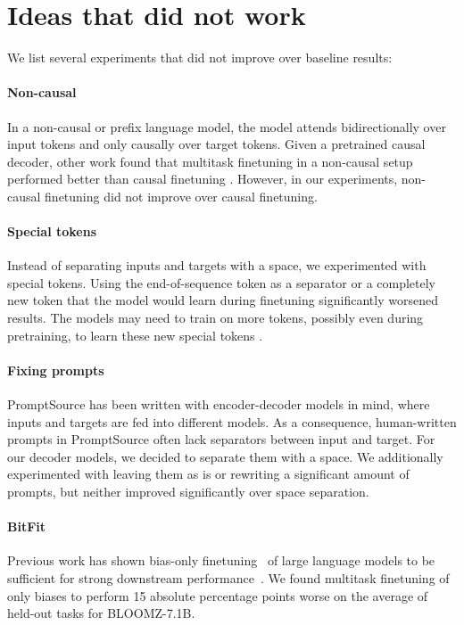 \documentclass[11pt]{article}
\begin{document}
 
\FloatBarrier

\section{Ideas that did not work}
\label{sec:failures}

We list several experiments that did not improve over baseline results:

\paragraph{Non-causal} In a non-causal or prefix language model, the model attends bidirectionally over input tokens and only causally over target tokens. Given a pretrained causal decoder, other work found that multitask finetuning in a non-causal setup performed better than causal finetuning \cite{wang2022language,tay2022transcending}. However, in our experiments, non-causal finetuning did not improve over causal finetuning.

\paragraph{Special tokens} Instead of separating inputs and targets with a space, we experimented with special tokens. Using the end-of-sequence token as a separator or a completely new token that the model would learn during finetuning significantly worsened results. The models may need to train on more tokens, possibly even during pretraining, to learn these new special tokens \cite{zeng2022glm}.

\paragraph{Fixing prompts} PromptSource has been written with encoder-decoder models in mind, where inputs and targets are fed into different models. As a consequence, human-written prompts in PromptSource often lack separators between input and target. For our decoder models, we decided to separate them with a space. We additionally experimented with leaving them as is or rewriting a significant amount of prompts, but neither improved significantly over space separation.

\paragraph{BitFit} Previous work has shown bias-only finetuning~\cite{zaken2021bitfit} of large language models to be sufficient for strong downstream performance~\cite{logan2021cutting,hu2021lora,muennighoff2022sgpt,liu2022few,ding2022delta,muennighoff2022mteb}. We found multitask finetuning of only biases to perform 15 absolute percentage points worse on the average of held-out tasks for BLOOMZ-7.1B.
\end{document}
